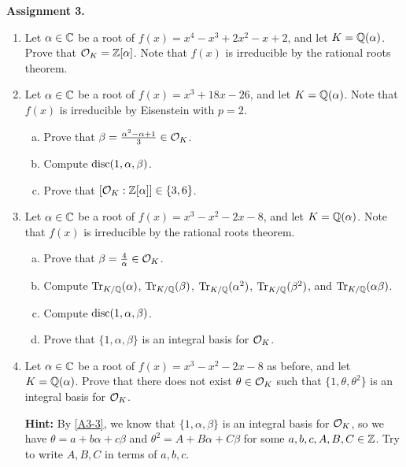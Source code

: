 {\bf Assignment 3.} 
\begin{enumerate}[leftmargin=1.5cm, label={{\bf A3-\arabic*}}]
    \item \label{A3-1} Let $\alpha \in \mathbb{C}$ be a root of $f(x) = x^4 - x^3 
    + 2x^2 - x + 2$, and let $K = \mathbb{Q}(\alpha)$. Prove that ${\cal O}_K 
    = \mathbb{Z}[\alpha]$. Note that $f(x)$ is irreducible by the rational roots 
    theorem.
    \item \label{A3-2} Let $\alpha \in \mathbb{C}$ be a root of $f(x) = x^3 + 18x - 26$, 
    and let $K = \mathbb{Q}(\alpha)$. Note that $f(x)$ is irreducible by 
    Eisenstein with $p = 2$. 
    \begin{enumerate}[(a)]
        \item Prove that $\beta = \frac{\alpha^2-\alpha+1}{3} \in {\cal O}_K$. 
        \item Compute $\operatorname{disc}(1, \alpha, \beta)$. 
        \item Prove that $[{\cal O}_K : \mathbb{Z}[\alpha]] \in \{3, 6\}$. 
    \end{enumerate}
    \item \label{A3-3} Let $\alpha \in \mathbb{C}$ be a root of $f(x) = x^3 - 
    x^2 - 2x - 8$, and let $K = \mathbb{Q}(\alpha)$. Note that $f(x)$ is irreducible 
    by the rational roots theorem. 
    \begin{enumerate}[(a)]
        \item Prove that $\beta = \frac{4}{\alpha} \in {\cal O}_K$. 
        \item Compute $\operatorname{Tr}_{K/\mathbb{Q}}(\alpha)$, $\operatorname{Tr}_{K/\mathbb{Q}}(\beta)$, 
        $\operatorname{Tr}_{K/\mathbb{Q}}(\alpha^2)$, $\operatorname{Tr}_{K/\mathbb{Q}}(\beta^2)$, and $\operatorname{Tr}_{K/\mathbb{Q}}(\alpha\beta)$. 
        \item Compute $\operatorname{disc}(1, \alpha, \beta)$. 
        \item Prove that $\{1, \alpha, \beta\}$ is an integral basis for ${\cal O}_K$.        
    \end{enumerate}
    \item \label{A3-4} Let $\alpha \in \mathbb{C}$ be a root of $f(x) = x^3 - 
    x^2 - 2x - 8$ as before, and let $K = \mathbb{Q}(\alpha)$. Prove that there 
    does not exist $\theta \in {\cal O}_K$ such that $\{1, \theta, \theta^2\}$ 
    is an integral basis for ${\cal O}_K$. 
    
    {\bf Hint:} By \ref{A3-3}, we know that $\{1, \alpha, \beta\}$ is an 
    integral basis for ${\cal O}_K$, so we have $\theta = a + b\alpha + c\beta$
    and $\theta^2 = A + B\alpha + C\beta$ for some $a, b, c, A, B, C \in \mathbb{Z}$. 
    Try to write $A, B, C$ in terms of $a, b, c$.
\end{enumerate}